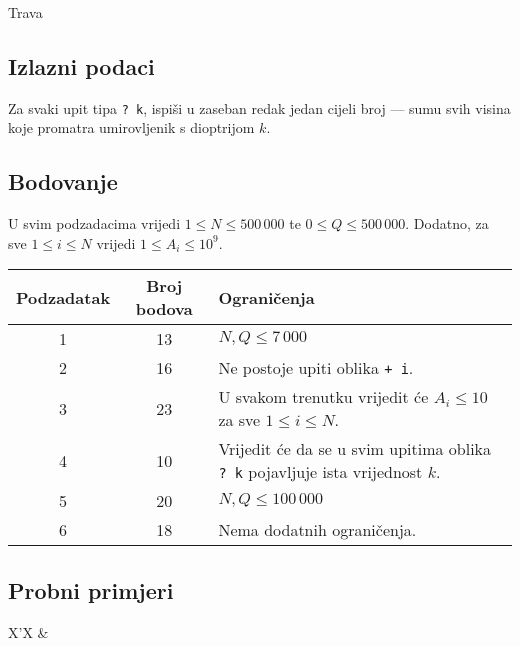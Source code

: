 \begin{statement}[
  problempoints=100,
  timelimit=3.5 sekundi,
  memorylimit=512 MiB,
]{Trava}
\subsection*{Izlazni podaci}

Za svaki upit tipa \texttt{\frenchspacing? k}, ispiši u zaseban redak jedan cijeli broj — sumu svih visina koje promatra umirovljenik s dioptrijom $k$.

\subsection*{Bodovanje}

U svim podzadacima vrijedi $1 \leq N \leq 500\,000$ te $0 \leq Q \leq 500\,000$. Dodatno, za sve $1 \leq i \leq N$ vrijedi $1 \leq A_i \leq 10^9$.

{\renewcommand{\arraystretch}{1.4}
  \setlength{\tabcolsep}{6pt}
  \begin{tabular}{ccl}
   Podzadatak & Broj bodova & Ograničenja \\ \midrule
   	1 & 13 & $N, Q \leq 7\,000$ \\
   	2 & 16 & Ne postoje upiti oblika \texttt{+ i}. \\
   	3 & 23 & U svakom trenutku vrijedit će $A_i \leq 10$ za sve $1 \leq i \leq N$. \\
   	4 & 10 & Vrijedit će da se u svim upitima oblika \texttt{\frenchspacing? k} pojavljuje ista vrijednost $k$. \\
   	5 & 20 & $N, Q \leq 100\,000$ \\
   	6 & 18 & Nema dodatnih ograničenja. \\ 
\end{tabular}}

\subsection*{Probni primjeri}
\begin{tabularx}{\textwidth}{X'X}
 &
\end{tabularx}

\end{statement}

